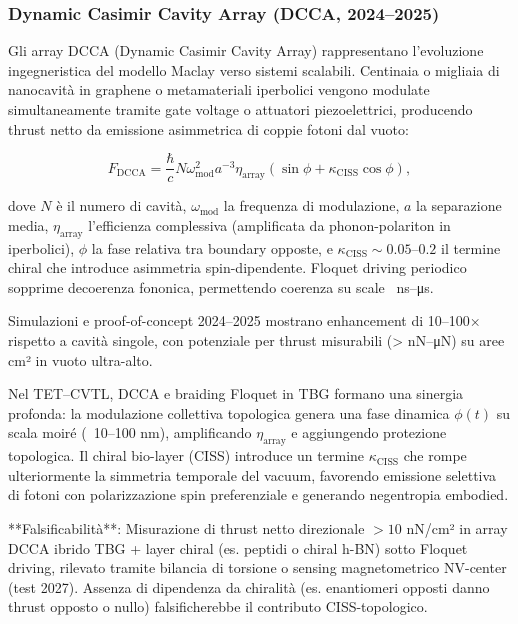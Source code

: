 \documentclass[11pt,a4paper]{article}
\theoremstyle{plain}
\theoremstyle{definition}
\begin{document}
\subsubsection{Dynamic Casimir Cavity Array (DCCA, 2024--2025)}

Gli array DCCA (Dynamic Casimir Cavity Array) rappresentano l'evoluzione ingegneristica del modello Maclay verso sistemi scalabili. Centinaia o migliaia di nanocavità in graphene o metamateriali iperbolici vengono modulate simultaneamente tramite gate voltage o attuatori piezoelettrici, producendo thrust netto da emissione asimmetrica di coppie fotoni dal vuoto:

\begin{equation}
F_{\mathrm{DCCA}} = \frac{\hbar}{c} N \omega_{\mathrm{mod}}^2 a^{-3} \eta_{\mathrm{array}} \left( \sin\phi + \kappa_{\mathrm{CISS}} \cos\phi \right),
\label{eq:dcca-thrust-updated}
\end{equation}

dove $N$ è il numero di cavità, $\omega_{\mathrm{mod}}$ la frequenza di modulazione, $a$ la separazione media, $\eta_{\mathrm{array}}$ l'efficienza complessiva (amplificata da phonon-polariton in iperbolici), $\phi$ la fase relativa tra boundary opposte, e $\kappa_{\mathrm{CISS}} \sim 0.05$--$0.2$ il termine chiral che introduce asimmetria spin-dipendente. Floquet driving periodico sopprime decoerenza fononica, permettendo coerenza su scale ~ns–μs.

Simulazioni e proof-of-concept 2024–2025 mostrano enhancement di 10–100× rispetto a cavità singole, con potenziale per thrust misurabili (> nN–μN) su aree cm² in vuoto ultra-alto.

Nel TET–CVTL, DCCA e braiding Floquet in TBG formano una sinergia profonda: la modulazione collettiva topologica genera una fase dinamica $\phi(t)$ su scala moiré (~10–100 nm), amplificando $\eta_{\mathrm{array}}$ e aggiungendo protezione topologica. Il chiral bio-layer (CISS) introduce un termine $\kappa_{\mathrm{CISS}}$ che rompe ulteriormente la simmetria temporale del vacuum, favorendo emissione selettiva di fotoni con polarizzazione spin preferenziale e generando negentropia embodied.

**Falsificabilità**: Misurazione di thrust netto direzionale $> 10$ nN/cm² in array DCCA ibrido TBG + layer chiral (es. peptidi o chiral h-BN) sotto Floquet driving, rilevato tramite bilancia di torsione o sensing magnetometrico NV-center (test 2027). Assenza di dipendenza da chiralità (es. enantiomeri opposti danno thrust opposto o nullo) falsificherebbe il contributo CISS-topologico.
\end{document}
